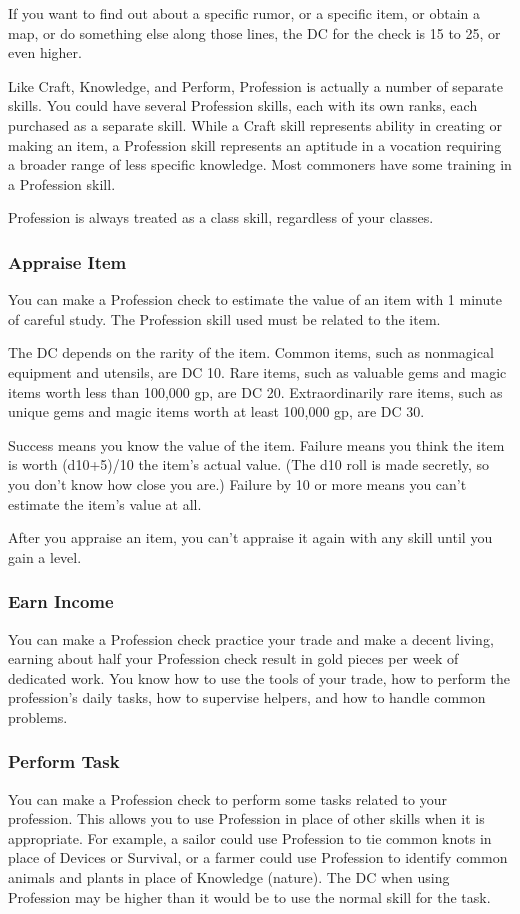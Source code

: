 If you want to find out about a specific rumor, or a specific item, or obtain a map, or do something else along those lines, the DC for the check is 15 to 25, or even higher.

Like Craft, Knowledge, and Perform, Profession is actually a number of separate skills. You could have several Profession skills, each with its own ranks, each purchased as a separate skill. While a Craft skill represents ability in creating or making an item, a Profession skill represents an aptitude in a vocation requiring a broader range of less specific knowledge. Most commoners have some training in a Profession skill.

Profession is always treated as a class skill, regardless of your classes.

\subsubsection{Appraise Item}
You can make a Profession check to estimate the value of an item with 1 minute of careful study. The Profession skill used must be related to the item.

The DC depends on the rarity of the item. Common items, such as nonmagical equipment and utensils, are DC 10. Rare items, such as valuable gems and magic items worth less than 100,000 gp, are DC 20. Extraordinarily rare items, such as unique gems and magic items worth at least 100,000 gp, are DC 30.

Success means you know the value of the item. Failure means you think the item is worth (d10+5)/10 \mtimes the item's actual value. (The d10 roll is made secretly, so you don't know how close you are.) Failure by 10 or more means you can't estimate the item's value at all.

After you appraise an item, you can't appraise it again with any skill until you gain a level.

\subsubsection{Earn Income}
You can make a Profession check practice your trade and make a decent living, earning about half your Profession check result in gold pieces per week of dedicated work. You know how to use the tools of your trade, how to perform the profession's daily tasks, how to supervise helpers, and how to handle common problems.

\subsubsection{Perform Task}
You can make a Profession check to perform some tasks related to your profession. This allows you to use Profession in place of other skills when it is appropriate. For example, a sailor could use Profession to tie common knots in place of Devices or Survival, or a farmer could use Profession to identify common animals and plants in place of Knowledge (nature). The DC when using Profession may be higher than it would be to use the normal skill for the task.

